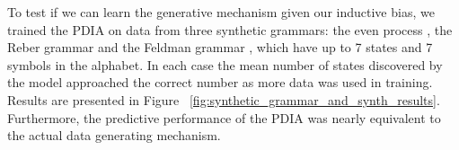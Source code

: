 To test if we can learn the generative mechanism given our inductive bias, we trained the PDIA on data from three synthetic grammars: the even process \cite{Shalizi2004}, the Reber grammar \cite{Reber1967} and the Feldman grammar \cite{Feldman1966}, which have up to 7 states and 7 symbols in the alphabet.  In each case the mean number of states discovered by the model approached the correct number as more data was used in training.  Results are presented in Figure~ \ref{fig:synthetic_grammar_and_synth_results}.  Furthermore, the predictive performance of the PDIA was nearly equivalent to the actual data generating mechanism.
%
\begin{figure}[htbp]
\centering
{} \hspace{-.55cm} 
  \hspace{-1.25cm} 
 \\

\end{figure}
